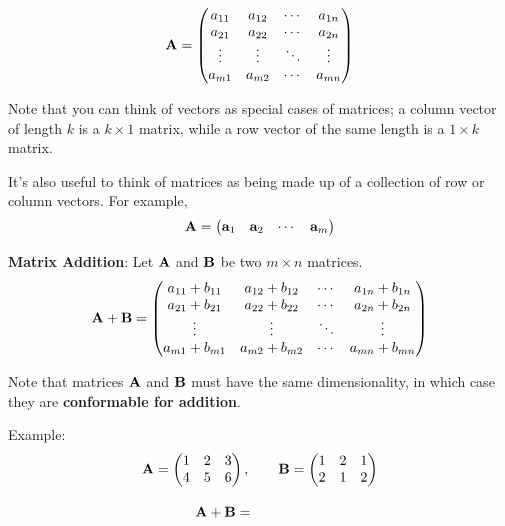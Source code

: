 \documentclass[]{book}
\theoremstyle{definition}
\theoremstyle{definition}
\theoremstyle{definition}
\theoremstyle{remark}
\begin{document}
\[{\bf A}=\begin{pmatrix}
            a_{11} & a_{12} & \cdots & a_{1n} \\
            a_{21} & a_{22} & \cdots & a_{2n} \\
            \vdots & \vdots & \ddots & \vdots \\
            a_{m1} & a_{m2} & \cdots & a_{mn}
        \end{pmatrix}\]

Note that you can think of vectors as special cases of matrices; a
column vector of length \(k\) is a \(k \times 1\) matrix, while a row
vector of the same length is a \(1 \times k\) matrix.

It's also useful to think of matrices as being made up of a collection
of row or column vectors. For example,
\[\bf A = \begin{pmatrix} {\bf a}_1 & {\bf a}_2 &  \cdots & {\bf a}_m \end{pmatrix}\]

\textbf{Matrix Addition}: Let \(\bf A\) and \(\bf B\) be two
\(m\times n\) matrices. \[{\bf A+B}=\begin{pmatrix}
            a_{11}+b_{11} & a_{12}+b_{12} & \cdots & a_{1n}+b_{1n} \\
            a_{21}+b_{21} & a_{22}+b_{22} & \cdots & a_{2n}+b_{2n} \\
            \vdots & \vdots  & \ddots & \vdots \\
            a_{m1}+b_{m1} & a_{m2}+b_{m2} & \cdots & a_{mn}+b_{mn}
        \end{pmatrix}\]

Note that matrices \({\bf A}\) and \({\bf B}\) must have the same
dimensionality, in which case they are \textbf{conformable for
addition}.

Example:
\[{\bf A}=\begin{pmatrix} 1 & 2 & 3 \\ 4 & 5 & 6 \end{pmatrix}, \qquad
            {\bf B}=\begin{pmatrix} 1 & 2 & 1 \\ 2 & 1 & 2 \end{pmatrix}\]
\[{\bf A+B}= \phantom{\begin{pmatrix} 2 & 4 & 4 \\ 6 & 6 & 8 \end{pmatrix}}\]
\end{document}
